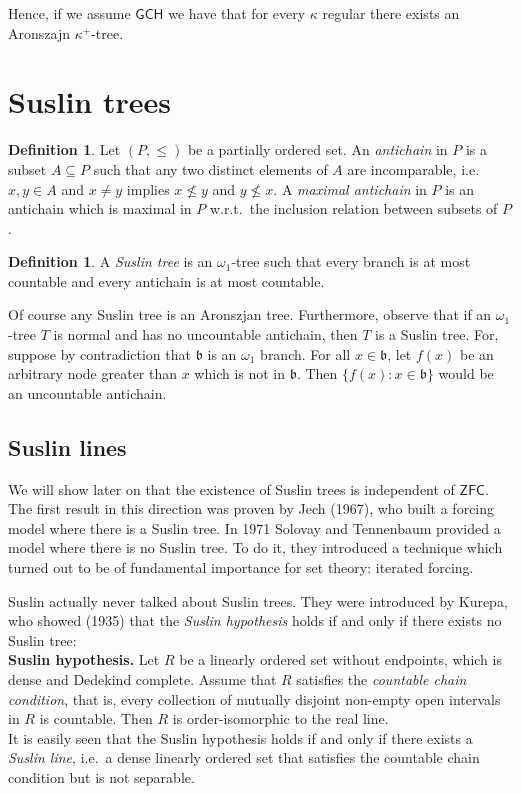 \documentclass[12pt,a4paper]{report}
\theoremstyle{definition}
\newtheorem{defn}[theorem]{Definition}
\theoremstyle{num.custom-title}
\DeclareMathOperator{\sse}{\subseteq}
\newcommand{\ZFC}{\ensuremath{\mathsf{ZFC}}\xspace}
\newcommand{\GCH}{\ensuremath{\mathsf{GCH}}\xspace}
\begin{document}
Hence, if we assume \GCH we have that for every $\kappa$ regular there exists an Aronszajn $\kappa^+$-tree.



\section{Suslin trees}

\begin{defn}
Let $(P, \leq)$ be a partially ordered set. An \emph{antichain} in $P$ is a subset $A \sse P$ such that any two distinct elements of $A$ are incomparable, i.e.\ $x,y \in A$ and $x \neq y$ implies $x \nleq y$ and $y \nleq x$. A \emph{maximal antichain} in $P$ is an antichain which is maximal in $P$ w.r.t.\ the inclusion relation between subsets of $P$.
\end{defn}

\begin{defn}
A \emph{Suslin tree} is an $\omega_1$-tree such that every branch is at most countable and every antichain is at most countable.
\end{defn}

Of course any Suslin tree is an Aronszjan tree. Furthermore, observe that if an $\omega_1$-tree $T$ is normal and has no uncountable antichain, then $T$ is a Suslin tree. For, suppose by contradiction that $\mathfrak{b}$ is an $\omega_1$ branch. For all $x \in \mathfrak{b}$, let $f(x)$ be an arbitrary node greater than $x$ which is not in $\mathfrak{b}$. Then $\{f(x) : x \in \mathfrak{b}\}$ would be an uncountable antichain.

\subsection{Suslin lines}

We will show later on that the existence of Suslin trees is independent of \ZFC. The first result in this direction was proven by Jech (1967), who built a forcing model where there is a Suslin tree. In 1971 Solovay and Tennenbaum provided a model where there is no Suslin tree. To do it, they introduced a technique which turned out to be of fundamental importance for set theory: iterated forcing.

Suslin actually never talked about Suslin trees. They were introduced by Kurepa, who showed (1935) that the \emph{Suslin hypothesis} holds if and only if there exists no Suslin tree:
\\[6pt]
\textbf{Suslin hypothesis.} Let $R$ be a linearly ordered set without endpoints, which is dense and Dedekind complete. Assume that $R$ satisfies the \emph{countable chain condition}, that is, every collection of mutually disjoint non-empty open intervals in $R$ is countable. Then $R$ is order-isomorphic to the real line.
\\[6pt]
It is easily seen that the Suslin hypothesis holds if and only if there exists a \emph{Suslin line}, i.e.\ a dense linearly ordered set that satisfies the countable chain condition but is not separable.
\end{document}
